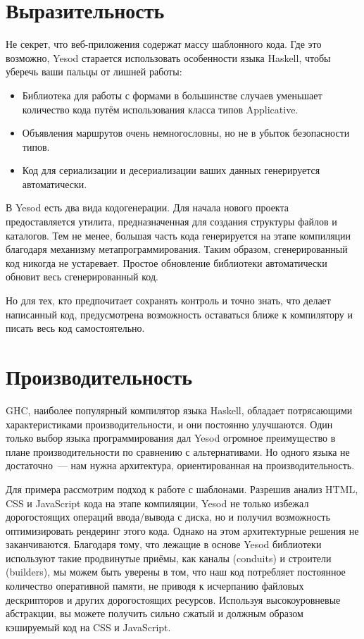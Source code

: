 \section{Выразительность}

Не секрет, что веб-приложения содержат массу шаблонного кода. Где это возможно,
Yesod старается использовать особенности языка Haskell, чтобы уберечь ваши
пальцы от лишней работы:

\begin{itemize}
    \item Библиотека для работы с формами в большинстве случаев уменьшает
        количество кода путём использования класса типов Applicative.
    \item Объявления маршрутов очень немногословны, но не в убыток безопасности
        типов.
    \item Код для сериализации и десериализации ваших данных генерируется
        автоматически.
\end{itemize}

В Yesod есть два вида кодогенерации. Для начала нового проекта предоставляется
утилита, предназначенная для создания структуры файлов и каталогов. Тем не
менее, большая часть кода генерируется на этапе компиляции благодаря механизму
метапрограммирования. Таким образом, сгенерированный код никогда не устаревает.
Простое обновление библиотеки автоматически обновит весь сгенерированный код.

Но для тех, кто предпочитает сохранять контроль и точно знать, что делает
написанный код, предусмотрена возможность оставаться ближе к компилятору и
писать весь код самостоятельно.

\section{Производительность}

GHC, наиболее популярный компилятор языка Haskell, обладает потрясающими
характеристиками производительности, и они постоянно улучшаются. Один только
выбор языка программирования дал Yesod огромное преимущество в плане
производительности по сравнению с альтернативами. Но одного языка не
достаточно~--- нам нужна архитектура, ориентированная на производительность.

Для примера рассмотрим подход к работе с шаблонами. Разрешив анализ HTML, CSS и
JavaScript кода на этапе компиляции, Yesod не только избежал дорогостоящих
операций ввода/вывода с диска, но и получил возможность оптимизировать
рендеринг этого кода. Однако на этом архитектурные решения не заканчиваются.
Благодаря тому, что лежащие в основе Yesod библиотеки используют такие
продвинутые приёмы, как каналы (conduits) и строители (builders), мы можем быть
уверены в том, что наш код потребляет постоянное количество оперативной памяти,
не приводя к исчерпанию файловых дескрипторов и других дорогостоящих ресурсов.
Используя высокоуровневые абстракции, вы можете получить сильно сжатый и
должным образом кэшируемый код на CSS и JavaScript.

